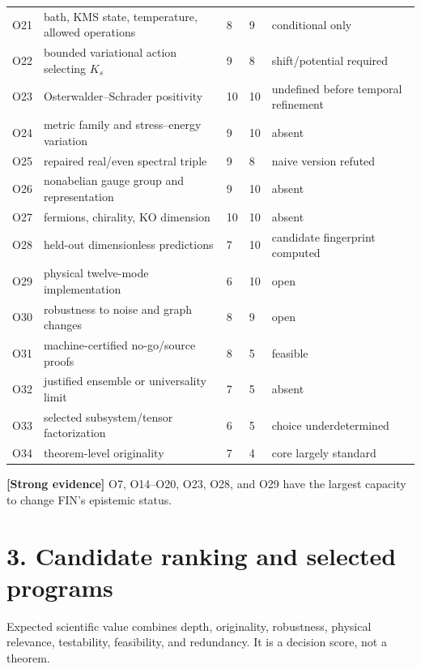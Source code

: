 \documentclass[11pt,a4paper,openany]{report}
\newcommand{\statusStrong}{\textcolor{finblue}{[Strong evidence]}}
\begin{document}
\begin{center}
\begin{longtable}{@{}p{}p{}p{}p{}p{}@{}}
O21 & bath, KMS state, temperature, allowed operations & 8 & 9 & conditional only \\
O22 & bounded variational action selecting \(K_s\) & 9 & 8 & shift/\allowbreak{}potential required \\
O23 & Osterwalder–Schrader positivity & 10 & 10 & undefined before temporal refinement \\
O24 & metric family and stress–energy variation & 9 & 10 & absent \\
O25 & repaired real/\allowbreak{}even spectral triple & 9 & 8 & naive version refuted \\
O26 & nonabelian gauge group and representation & 9 & 10 & absent \\
O27 & fermions, chirality, KO dimension & 10 & 10 & absent \\
O28 & held-out dimensionless predictions & 7 & 10 & candidate fingerprint computed \\
O29 & physical twelve-mode implementation & 6 & 10 & open \\
O30 & robustness to noise and graph changes & 8 & 9 & open \\
O31 & machine-certified no-go/\allowbreak{}source proofs & 8 & 5 & feasible \\
O32 & justified ensemble or universality limit & 7 & 5 & absent \\
O33 & selected subsystem/\allowbreak{}tensor factorization & 6 & 5 & choice underdetermined \\
O34 & theorem-level originality & 7 & 4 & core largely standard \\
\bottomrule
\end{longtable}
\endgroup
\end{center}

\textbf{\statusStrong{}} O7, O14–O20, O23, O28, and O29 have the largest capacity to change FIN’s epistemic status.

\section{3. Candidate ranking and selected programs}

Expected scientific value combines depth, originality, robustness, physical relevance, testability, feasibility, and redundancy. It is a decision score, not a theorem.
\end{document}
